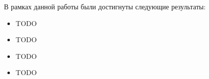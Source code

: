 \documentclass[../diploma.tex]{subfiles}
\begin{document}
В рамках данной работы были достигнуты следующие результаты: 

\begin{itemize}
	\item TODO
	\item TODO
	\item TODO
	\item TODO
\end{itemize}
\end{document}
